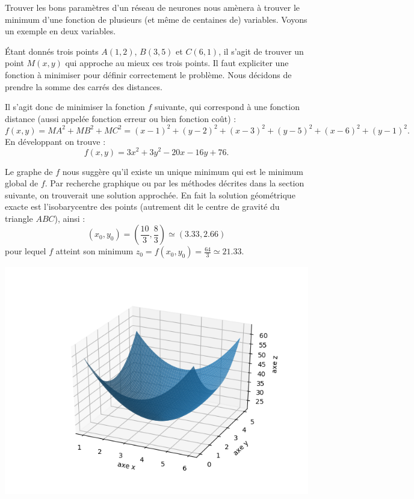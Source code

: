 \documentclass[11pt,class=report,crop=false]{standalone}
\begin{document}
Trouver les bons paramètres d'un réseau de neurones nous amènera à trouver le minimum d'une fonction de plusieurs (et même de centaines de) variables. Voyons un exemple en deux variables.
\begin{exemple}
Étant donnés trois points $A(1,2)$, $B(3,5)$ et $C(6,1)$, il s'agit de trouver un point $M(x,y)$ qui \og{}approche au mieux\fg{} ces trois points. Il faut expliciter une fonction à minimiser pour définir correctement le problème. Nous décidons de prendre la somme des carrés des distances.


   
Il s'agit donc de minimiser la fonction $f$ suivante, qui correspond à une fonction distance (aussi appelée fonction erreur ou bien fonction coût) :
$$f(x,y) = MA^2+MB^2+MC^2 = 
(x-1)^2+ (y-2)^2 + (x-3)^2 + (y-5)^2 + (x-6)^2 + (y-1)^2.$$
En développant on trouve :
$$f(x,y) = 3x^2 + 3y^2 - 20x - 16y + 76.$$

Le graphe de $f$ nous suggère qu'il existe un unique minimum qui est le minimum global de $f$. 
 Par recherche graphique ou par les méthodes décrites dans la section suivante, on trouverait une solution approchée. En fait la solution géométrique exacte est l'isobarycentre des points (autrement dit le centre de gravité du triangle $ABC$), ainsi :
 $$(x_0,y_0) = \left(\frac{10}{3},\frac83\right) \simeq (3.33,2.66)$$
 pour lequel $f$ atteint son minimum $z_0 = f(x_0,y_0) = \frac{64}{3} \simeq 21.33$.

\begin{center}
\includegraphics[scale=\myscale,scale=0.7]{figures/fonctions-surface-4}
\end{center}


\end{exemple}
\end{document}
